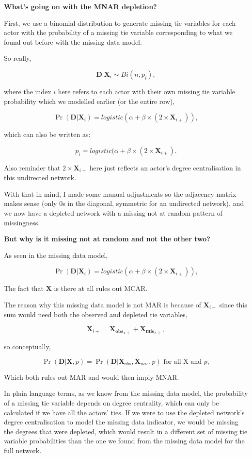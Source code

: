 \documentclass[
]{article}
\begin{document}
\textbf{What's going on with the MNAR depletion?}

First, we use a binomial distribution to generate missing tie variables
for each actor with the probability of a missing tie variable
corresponding to what we found out before with the missing data model.

So really,

\[\mathbf{D}| \mathbf{X}_{i} \sim Bi(n, p_i),\]

where the index \(i\) here refers to each actor with their own missing
tie variable probability which we modelled earlier (or the entire row),

\[\Pr(\mathbf{D}|\mathbf{X}_i) = logistic(\alpha + \beta \times (2 \times \mathbf{X}_{i+})),\]

which can also be written as:

\[p_i = logistic(\alpha + \beta \times (2 \times \mathbf{X}_{i+}).\]

Also reminder that \(2 \times \mathbf{X}_{i+}\) here just reflects an
actor's degree centralisation in this undirected network.

With that in mind, I made some manual adjustments so the adjacency
matrix makes sense (only 0s in the diagonal, symmetric for an undirected
network), and we now have a depleted network with a missing not at
random pattern of missingness.

\textbf{But why is it missing not at random and not the other two?}

As seen in the missing data model,

\[\Pr(\mathbf{D}|\mathbf{X}_i) = logistic(\alpha + \beta \times (2 \times \mathbf{X}_{i+})),\]

The fact that \(\mathbf{X}\) is there at all rules out MCAR.

The reason why this missing data model is not MAR is because of
\(\mathbf{X}_{i+}\) since this sum would need both the observed and
depleted tie variables,

\[\mathbf{X}_{i+} = \mathbf{X_{obs}}_{i+} +  \mathbf{X_{mis}}_{i+},\]

so conceptually,

\[\Pr(\mathbf{D}|\mathbf{X}, p) = \Pr(\mathbf{D} | \mathbf{X}_{obs}, \mathbf{X}_{mis}, p) \text{ for all X and } p,\]

Which both rules out MAR and would then imply MNAR.

In plain language terms, as we know from the missing data model, the
probability of a missing tie variable depends on degree centrality,
which can only be calculated if we have all the actors' ties. If we were
to use the depleted network's degree centralisation to model the missing
data indicator, we would be missing the degrees that were depleted,
which would result in a different set of missing tie variable
probabilities than the one we found from the missing data model for the
full network.
\end{document}
